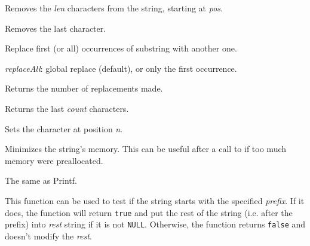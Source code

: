 Removes the {\it len} characters from the string, starting at {\it pos}.

\label{wxstringremovelast}


Removes the last character.

\label{wxstringreplace}


Replace first (or all) occurrences of substring with another one.

{\it replaceAll}: global replace (default), or only the first occurrence.

Returns the number of replacements made.

\label{wxstringright}


Returns the last {\it count} characters.

\label{wxstringsetchar}


Sets the character at position {\it n}.

\label{wxstringshrink}


Minimizes the string's memory. This can be useful after a call to 
 if too much memory were preallocated.

\label{wxstringsprintf}


The same as Printf.

\label{wxstringstartswith}


This function can be used to test if the string starts with the specified 
{\it prefix}. If it does, the function will return {\tt true} and put the rest
of the string (i.e. after the prefix) into {\it rest} string if it is not 
{\tt NULL}. Otherwise, the function returns {\tt false} and doesn't modify the 
{\it rest}.

